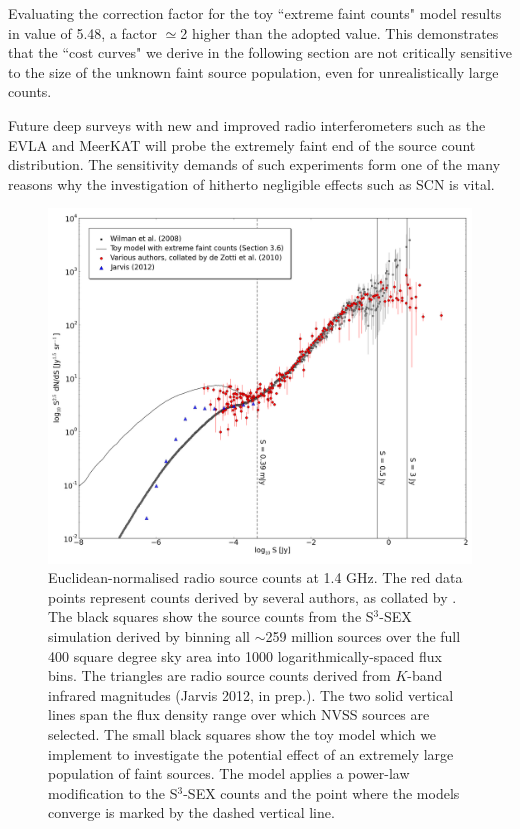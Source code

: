 \documentclass{aa}
\begin{document}
Evaluating the correction factor for the toy ``extreme faint counts" model results in value of 5.48, a factor $\simeq$2 higher than the adopted value. This demonstrates that the ``cost curves" we derive in the following section are not critically sensitive to the size of the unknown faint source population, even for unrealistically large counts.

Future deep surveys with new and improved radio interferometers such as the EVLA and MeerKAT \citep[e.g.][]{Jarvis-MeerKAT-SALT,Heywood-MESMER} will probe the extremely faint end of the source count distribution. The sensitivity demands of such experiments form one of the many reasons why the investigation of hitherto negligible effects such as SCN is vital.

\begin{figure}
\centering
\includegraphics[width = \columnwidth]{1400_source_counts_1000}
\caption{Euclidean-normalised radio source counts at 1.4 GHz. The red data points represent counts derived by several authors, as collated by \citet{deZotti-surveys}. The black squares show the source counts from the S$^{3}$-SEX simulation derived by binning all $\sim$259 million sources over the full 400 square degree sky area into 1000 logarithmically-spaced flux bins. The triangles are radio source counts derived from $K$-band infrared magnitudes (Jarvis 2012, in prep.). The two solid vertical lines span the flux density range over which NVSS sources are selected. The small black squares show the toy model which we implement to investigate the potential effect of an extremely large population of faint sources. The model applies a power-law modification to the S$^{3}$-SEX counts and the point where the models converge is marked by the dashed vertical line.  \label{fig:source_counts}}
\end{figure}
\end{document}
